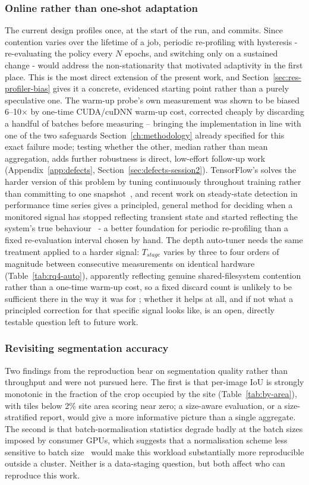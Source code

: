 \subsubsection{Online rather than one-shot adaptation}
The current design profiles once, at the start of the run, and commits.
Since contention varies over the lifetime of a job, periodic re-profiling with
hysteresis - re-evaluating the policy every $N$ epochs, and switching only on a
sustained change - would address the non-stationarity that motivated adaptivity in
the first place.
This is the most direct extension of the present work, and Section~\ref{sec:res-profiler-bias}
gives it a concrete, evidenced starting point rather than a purely speculative one.
The warm-up probe's own \Tgpu{} measurement was shown to be biased 6--10$\times$ by
one-time CUDA/cuDNN warm-up cost, corrected cheaply by discarding a handful of
batches before measuring -- bringing the implementation in line with one of the
two safeguards Section~\ref{ch:methodology} already specified for this exact
failure mode; testing whether the other, median rather than mean aggregation,
adds further robustness is direct, low-effort follow-up work
(Appendix~\ref{app:defects}, Section~\ref{sec:defects-session2}). TensorFlow's
  solves the
harder version of this problem by tuning continuously throughout training rather
than committing to one snapshot~\cite{Murray21}, and recent work on steady-state
detection in performance time series gives a principled, general method for
deciding when a monitored signal has stopped reflecting transient state and
started reflecting the system's true behaviour~\cite{Beseda25} - a better
foundation for periodic re-profiling than a fixed re-evaluation interval chosen
by hand. The depth auto-tuner needs the same treatment applied to a harder
signal: $T_{stage}$ varies by three to four orders of magnitude between
consecutive measurements on identical hardware (Table~\ref{tab:rq4-auto}),
apparently reflecting genuine shared-filesystem contention rather than a
one-time warm-up cost, so a fixed discard count is unlikely to be sufficient
there in the way it was for \Tgpu{}; whether it helps at all, and if not what a
principled correction for that specific signal looks like, is an open,
directly testable question left to future work.

\subsubsection{Revisiting segmentation accuracy}
Two findings from the reproduction bear on segmentation quality rather than
throughput and were not pursued here.
The first is that per-image IoU is strongly monotonic in the fraction of the crop
occupied by the site (Table~\ref{tab:by-area}), with tiles below 2\% site area
scoring near zero; a size-aware evaluation, or a size-stratified report, would give
a more informative picture than a single aggregate.
The second is that batch-normalisation statistics degrade badly at the batch sizes
imposed by consumer GPUs, which suggests that a normalisation scheme less
sensitive to batch size~\cite{Wu18} would make this workload substantially more
reproducible outside a cluster.
Neither is a data-staging question, but both affect who can reproduce this work.

